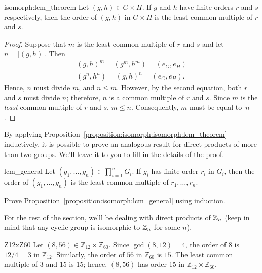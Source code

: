 \begin{prop}{isomorph:lcm_theorem}
Let $(g, h) \in G \times H$. If $g$ and $h$ have finite orders $r$ and
$s$ respectively, then the order of $(g, h)$ in $G \times H$ is the
least common multiple of $r$ and $s$. 
\end{prop}

 
\begin{proof}
Suppose that $m$ is the least common multiple of $r$ and $s$ and let
$n = |(g,h)|$. Then 
\begin{gather*}
(g,h)^m  = (g^m, h^m) = (e_G,e_H) \\
(g^n, h^n)  = (g, h)^n = (e_G,e_H).
\end{gather*}
Hence, $n$ must divide $m$, and $n \leq m$.  However, by the second
equation, both $r$ and $s$ must divide $n$; therefore, $n$ is a common
multiple of $r$ and $s$. Since $m$ is the {\em least} common multiple
of $r$ and $s$, $m \leq n$.  Consequently, $m$ must be equal to~$n$.
\end{proof}

By applying Proposition~\ref{proposition:isomorph:isomorph:lcm_theorem} inductively, it is possible to prove an analogous result for direct products of more than two groups. We'll leave it to you to fill in the details of the proof.

\begin{prop}{lcm_general}
Let $(g_1, \ldots, g_n) \in \prod_{i=1}^n  G_i$. If $g_i$ has finite order
$r_i$ in $G_i$, then the order of $(g_1, \ldots, g_n)$ 
is the least common multiple of $r_1, \ldots, r_n$.
\end{prop}
 
\begin{exercise}{}
Prove Proposition~\ref{proposition:isomorph:lcm_general} using induction.
\end{exercise}

 
 For the rest of the section, we'll be dealing with direct products of $\mathbb{Z}_n$ (keep in mind that any cyclic group is isomorphic to $\mathbb{Z}_n$ for some $n$). 

\begin{example}{Z12xZ60}
Let $(8, 56) \in {\mathbb Z}_{12} \times  {\mathbb Z}_{60}$. Since
$\gcd(8,12) = 4$, the order of 8 is $12/4 = 3$ in ${\mathbb Z}_{12}$.
Similarly, the order of $56$ in ${\mathbb Z}_{60}$ is $15$. The least
common multiple of 3 and 15 is 15; hence, $(8, 56)$ has order 15 in
${\mathbb Z}_{12} \times  {\mathbb Z}_{60}$.
\end{example}

